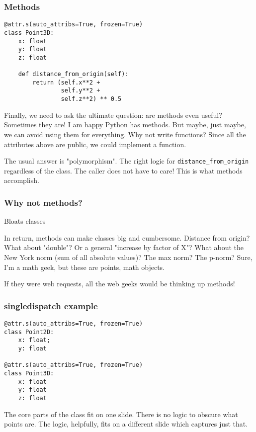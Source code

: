 \documentclass[ignorenonframetext,aspectration=169]{beamer}
\begin{document}
\begin{frame}[fragile]
\frametitle{Methods}

\begin{lstlisting}
@attr.s(auto_attribs=True, frozen=True)
class Point3D:
    x: float
    y: float
    z: float

    def distance_from_origin(self):
        return (self.x**2 +
                self.y**2 +
                self.z**2) ** 0.5
\end{lstlisting}

\end{frame}

Finally,
we need to ask the ultimate question:
are methods even useful?
Sometimes they are!
I am happy Python has methods.
But maybe,
just maybe,
we can avoid using them for everything.
Why not write functions?
Since all the attributes above are public,
we could implement a function.

The usual answer is "polymorphism".
The right logic for \lstinline!distance_from_origin!
regardless of the class.
The caller does not have to care!
This is what methods accomplish.

\begin{frame}[fragile]
\frametitle{Why not methods?}

Bloats classes

\end{frame}

In return,
methods can make classes big and cumbersome.
Distance from origin?
What about "double"?
Or a general "increase by factor of X"?
What about the New York norm
(sum of all absolute values)?
The max norm?
The p-norm?
Sure,
I'm a math geek,
but these are points,
math objects.

If they were web requests,
all the web geeks would be thinking up methods!

\begin{frame}[fragile]
\frametitle{singledispatch example}

\begin{lstlisting}
@attr.s(auto_attribs=True, frozen=True)
class Point2D:
    x: float;
    y: float

@attr.s(auto_attribs=True, frozen=True)
class Point3D:
    x: float
    y: float
    z: float
\end{lstlisting}

\end{frame}

The core parts of the class fit on one slide.
There is no logic to obscure what points are.
The logic,
helpfully,
fits on a different slide which captures just that.
\end{document}

